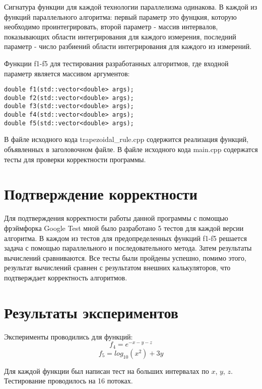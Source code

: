 \documentclass{report}
\begin{document}
\par Сигнатура функции для каждой технологии параллелизма одинакова. В каждой из функций параллельного алгоритма: первый параметр это фунцкия, которую необходимо проинтегрировать, второй параметр - массив интервалов, показывающих области интегрирования для каждого измерения, последний параметр - число разбиений области интегрирования для каждого из измерений.
\par Функции f1-f5 для тестирования разработанных алгоритмов, где входной параметр является массивом аргументов:
\begin{lstlisting}
double f1(std::vector<double> args);
double f2(std::vector<double> args);
double f3(std::vector<double> args);
double f4(std::vector<double> args);
double f5(std::vector<double> args);
\end{lstlisting}
\par В файле исходного кода trapezoidal\_rule.cpp содержится реализация функций, объявленных в заголовочном файле. В файле исходного кода main.cpp содержатся тесты для проверки корректности программы.
\newpage

\section*{Подтверждение корректности}
Для подтверждения корректности работы данной программы с помощью фрэймфорка Google Test мной было разработано 5 тестов для каждой версии алгоритма. В каждом из тестов для предопределенных функций f1-f5 решается задача с помощью параллельного и последовательного метода. Затем результаты вычислений
сравниваются. Все тесты были пройдены успешно, помимо этого, результат вычислений сравнен с результатом внешних калькуляторов, что подтверждает корректность алгоритмов.
\newpage

\section*{Результаты экспериментов}
Эксперименты проводились для функций:
$$f_4 = e^{-x-y-z} $$
$$f_5 = log_{10}(x^2) + 3y $$
\par Для каждой функции был написан тест на больших интервалах по $x$, $y$, $z$. Тестирование проводилось на 16 потоках.
\end{document}
